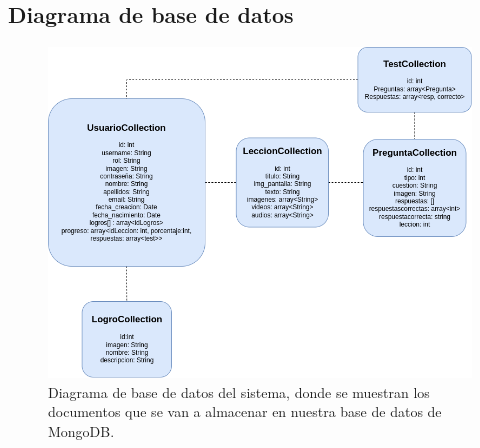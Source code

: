 \subsection{Diagrama de base de datos}

\begin{figure}[H]
    \centering
    \centerline{\includegraphics[width=\textwidth]{imagenes/c6/bbdd.png}}
    \caption{Diagrama de base de datos del sistema, donde se muestran los documentos que se van a almacenar en nuestra base de datos de MongoDB.}
    \label{fig:diagramadearquitectura}    
\end{figure}


